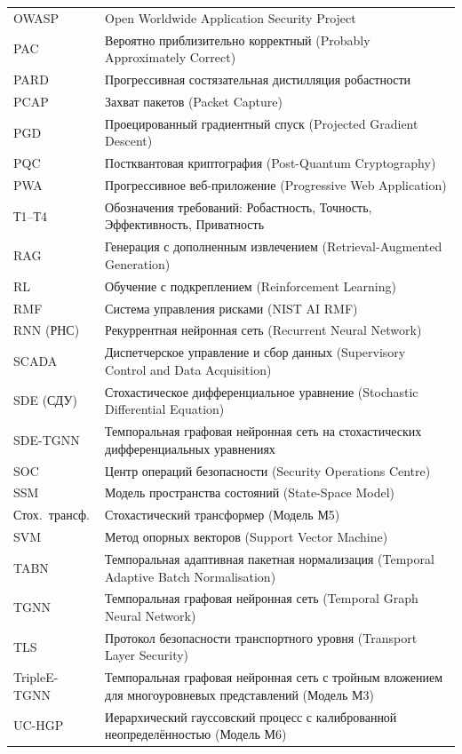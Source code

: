 \begin{longtable}{@{}p{3.8cm} p{10cm}@{}}
OWASP & Open Worldwide Application Security Project \\
PAC & Вероятно приблизительно корректный (Probably Approximately Correct) \\
PARD & Прогрессивная состязательная дистилляция робастности \\
PCAP & Захват пакетов (Packet Capture) \\
PGD & Проецированный градиентный спуск (Projected Gradient Descent) \\
PQC & Постквантовая криптография (Post-Quantum Cryptography) \\
PWA & Прогрессивное веб-приложение (Progressive Web Application) \\
Т1--Т4 & Обозначения требований: Робастность, Точность, Эффективность, Приватность \\
RAG & Генерация с дополненным извлечением (Retrieval-Augmented Generation) \\
RL & Обучение с подкреплением (Reinforcement Learning) \\
RMF & Система управления рисками (NIST AI RMF) \\
RNN (РНС) & Рекуррентная нейронная сеть (Recurrent Neural Network) \\
SCADA & Диспетчерское управление и сбор данных (Supervisory Control and Data Acquisition) \\
SDE (СДУ) & Стохастическое дифференциальное уравнение (Stochastic Differential Equation) \\
SDE-TGNN & Темпоральная графовая нейронная сеть на стохастических дифференциальных уравнениях \\
SOC & Центр операций безопасности (Security Operations Centre) \\
SSM & Модель пространства состояний (State-Space Model) \\
Стох.\ трансф. & Стохастический трансформер (Модель М5) \\
SVM & Метод опорных векторов (Support Vector Machine) \\
TABN & Темпоральная адаптивная пакетная нормализация (Temporal Adaptive Batch Normalisation) \\
TGNN & Темпоральная графовая нейронная сеть (Temporal Graph Neural Network) \\
TLS & Протокол безопасности транспортного уровня (Transport Layer Security) \\
TripleE-TGNN & Темпоральная графовая нейронная сеть с тройным вложением для многоуровневых представлений (Модель М3) \\
UC-HGP & Иерархический гауссовский процесс с калиброванной неопределённостью (Модель М6) \\
\end{longtable}

